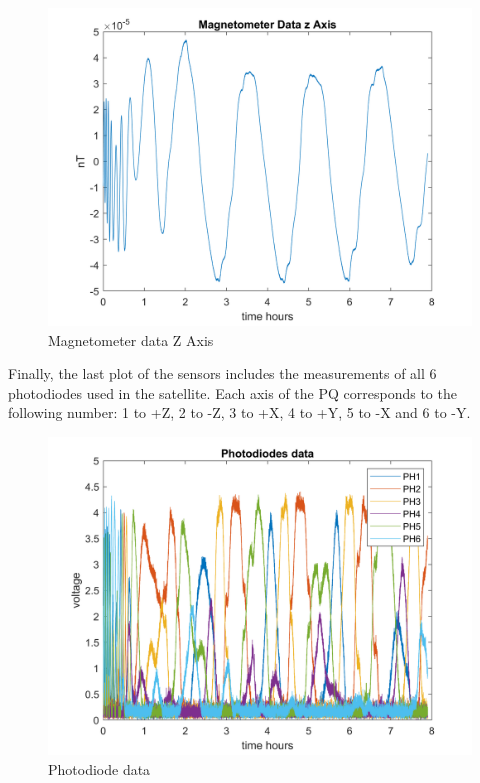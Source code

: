 \begin{itemize}
\begin{figure}[H]
\begin{minipage}{0.32\linewidth}
        \end{minipage}\hfill
        \begin{minipage}{0.32\linewidth}
            \centering
            \includegraphics[width=0.95\linewidth]{res/img/Nadir_no_EKF/Magnetometer data Z Axis.png}
            \caption{Magnetometer data Z Axis}
            \label{fig:MagnetometerDataZ}
        \end{minipage}
    \end{figure}

    Finally, the last plot of the sensors includes the measurements of all 6 photodiodes used in the satellite. 
    Each axis of the PQ corresponds to the following number: 1 to +Z, 2 to -Z, 3 to +X, 4 to +Y,
    5 to -X and 6 to -Y.
    \begin{figure}[H]
        \centering
        \includegraphics[width=0.7\linewidth]{res/img/Nadir_no_EKF/Photodiode data.png}
        \caption{Photodiode data}
        \label{fig:PhotodiodeData}
    \end{figure}


\end{itemize}
